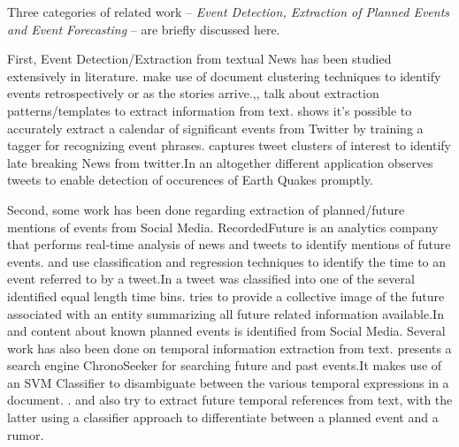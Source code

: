 Three categories of related work -- \emph{Event Detection, Extraction of Planned Events and  Event Forecasting} -- are briefly discussed here.

First, Event Detection/Extraction from textual News has been studied extensively in literature. \cite{Allan:2002:TDT} \cite{Yang:1998:SRO}\cite{Gabrilovich:2004:NPP} make use of document clustering techniques to identify events retrospectively or as the stories arrive.\cite{Chambers:2011:TIE},\cite{Banko07openinformation}, \cite{riloff2003learning} talk about extraction patterns/templates to extract information from text. \cite{Ritter:2012} shows it's possible to accurately extract a calendar of significant events from Twitter by training a tagger for recognizing event phrases.\cite{Sankaranarayanan:2009:TNT} captures tweet clusters of interest to identify late breaking News from twitter.In an altogether different application \cite{Sakaki:2010:EST} observes tweets to enable detection of occurences of Earth Quakes promptly.

Second, some work has been done regarding extraction of planned/future mentions of events from Social Media. RecordedFuture\cite{recordedFuture}  is an analytics company that performs real-time analysis of news and tweets to identify mentions of future events.\cite{tops2013predicting} and \cite{bosch2013estm} use classification and regression techniques to identify the time to an event referred to by a tweet.In \cite{tops2013predicting} a tweet was classified into one of the several identified equal length time bins. \cite{Jatowt:2011:ECE} tries to provide a collective image of the future associated with an entity summarizing all future related information available.In \cite{Becker:2012:ICP} and \cite{Becker_automaticidentification} content about known planned events is identified from Social Media. \iffalse \sathappanc{we do it on-line and focus mainly on planned protest and do it in multiple sources} \fi
Several work has also been done on temporal information extraction from text.
\cite{Kawai:2010:CSE} presents a search engine ChronoSeeker for searching future and past events.It makes use of an SVM Classifier to disambiguate between the various temporal expressions in a document. .\cite{baeza2005searching} and \cite{dias2011future} also try to extract future temporal references from text, with the latter using a classifier approach to differentiate between a planned event and a rumor.\iffalse \sathappanc{Also cite TEMPEX, TIMEN etc} \fi


